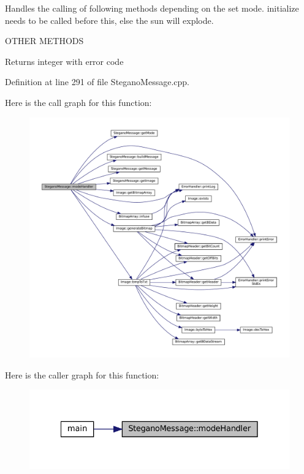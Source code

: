 Handles the calling of following methods depending on the set mode. initialize needs to be called before this, else the sun will explode. 

O\+T\+H\+ER M\+E\+T\+H\+O\+DS\begin{DoxyReturn}{Returns}
integer with error code 
\end{DoxyReturn}


Definition at line 291 of file Stegano\+Message.\+cpp.

Here is the call graph for this function\+:\nopagebreak
\begin{figure}[H]
\begin{center}
\leavevmode
\includegraphics[width=350pt]{classSteganoMessage_a2649e515941e730520b759282d00dcd6_cgraph}
\end{center}
\end{figure}
Here is the caller graph for this function\+:\nopagebreak
\begin{figure}[H]
\begin{center}
\leavevmode
\includegraphics[width=328pt]{classSteganoMessage_a2649e515941e730520b759282d00dcd6_icgraph}
\end{center}
\end{figure}
\mbox{\label{classSteganoMessage_a1fb7ba8950baa17684874ef931850a9c}} 
